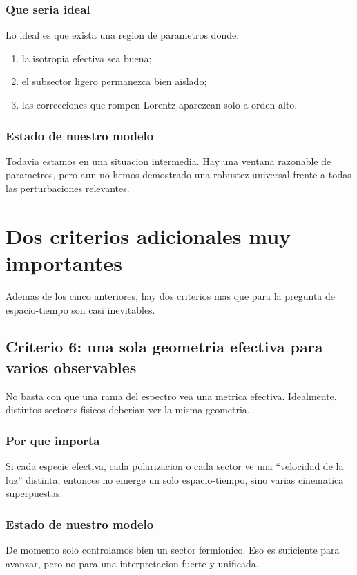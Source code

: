 \subsubsection*{Que seria ideal}
Lo ideal es que exista una region de parametros donde:
\begin{enumerate}[label=\arabic*.]
    \item la isotropia efectiva sea buena;
    \item el subsector ligero permanezca bien aislado;
    \item las correcciones que rompen Lorentz aparezcan solo a orden alto.
\end{enumerate}

\subsubsection*{Estado de nuestro modelo}
Todavia estamos en una situacion intermedia. Hay una ventana razonable de parametros, pero aun no hemos demostrado una robustez universal frente a todas las perturbaciones relevantes.

\section{Dos criterios adicionales muy importantes}
Ademas de los cinco anteriores, hay dos criterios mas que para la pregunta de espacio-tiempo son casi inevitables.

\subsection{Criterio 6: una sola geometria efectiva para varios observables}
No basta con que una rama del espectro vea una metrica efectiva. Idealmente, distintos sectores fisicos deberian ver la misma geometria.

\subsubsection*{Por que importa}
Si cada especie efectiva, cada polarizacion o cada sector ve una \enquote{velocidad de la luz} distinta, entonces no emerge un solo espacio-tiempo, sino varias cinematica superpuestas.

\subsubsection*{Estado de nuestro modelo}
De momento solo controlamos bien un sector fermionico. Eso es suficiente para avanzar, pero no para una interpretacion fuerte y unificada.

